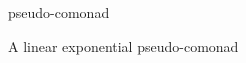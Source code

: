 \documentclass[10pt]{llncs}
\begin{document}
\begin{definition}
pseudo-comonad
\end{definition}
\begin{definition}
A linear exponential pseudo-comonad 
\end{definition}
%
\end{document}
